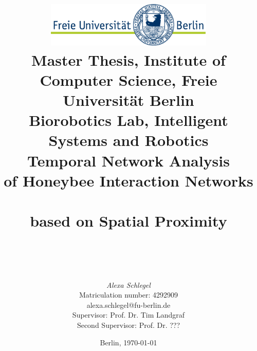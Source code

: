 %
\begin{titlepage}

\title{\includegraphics[width=0.6\textwidth]{Resources/FU_logo.pdf}\\
{\small Master Thesis, Institute of Computer Science, Freie Universität Berlin}\\
{\small Biorobotics Lab, Intelligent Systems and Robotics}\\
[6ex]
{\LARGE Temporal Network Analysis\\ of Honeybee Interaction Networks\\} \\
{\normalsize based on Spatial Proximity\\ }
\vspace{2ex}
\\
}

\author{
{\emph{\normalsize Alexa Schlegel}}\\
{\normalsize Matriculation number: 4292909}\\
{\normalsize alexa.schlegel@fu-berlin.de}\\ 
[15ex]   
{\normalsize Supervisor: Prof. Dr. Tim Landgraf}\\
{\normalsize Second Supervisor: Prof. Dr. ???}\\
}
\vspace{6ex}
\date{\normalsize Berlin, \today}
 
\maketitle  

\end{titlepage}